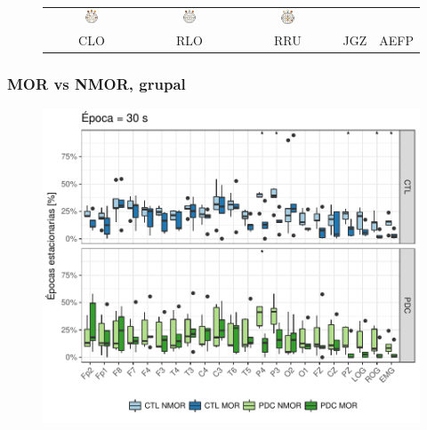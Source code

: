 \documentclass[serif,mathserif,professionalfont]{beamer}
\begin{document}
\begin{frame}
\begin{figure}
\begin{tabular}{ccccc}
\includegraphics[width=0.15\textwidth]{./img_art_dfa/cabeza_new_RRU_30.pdf} &
\includegraphics[width=0.15\textwidth]{./img_art_dfa/cabeza_new_JGZ_30.pdf} &
\includegraphics[width=0.15\textwidth]{./img_art_dfa/cabeza_new_AEFP_30.pdf} \\
CLO & RLO & RRU & JGZ & AEFP
\end{tabular}
\end{figure}
\end{frame}


\begin{frame}\frametitle{MOR vs NMOR, grupal}
\begin{figure}
\centering
\includegraphics[width=0.8\linewidth]
{./img_art_dfa/Comparacion_gpos_CTL_PDC_v3.pdf} 
\end{figure}
\end{frame}
\end{document}
